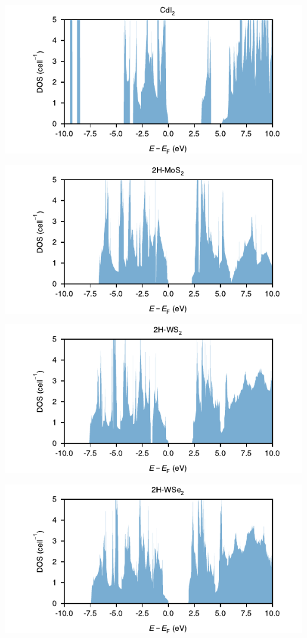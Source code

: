 \begin{center}
\includegraphics[width=.9\linewidth]{img/SI_figs/CdI2-DOS.pdf}
\end{center}
\begin{center}
\includegraphics[width=.9\linewidth]{img/SI_figs/2H-MoS2-DOS.pdf}
\end{center}
\begin{center}
\includegraphics[width=.9\linewidth]{img/SI_figs/2H-WS2-DOS.pdf}
\end{center}
\begin{center}
\includegraphics[width=.9\linewidth]{img/SI_figs/2H-WSe2-DOS.pdf}
\end{center}

